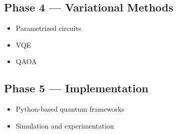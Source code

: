 \subsection*{Phase 4 --- Variational Methods}
\begin{itemize}
\item Parametrized circuits
\item VQE
\item QAOA
\end{itemize}

\subsection*{Phase 5 --- Implementation}
\begin{itemize}
\item Python-based quantum frameworks
\item Simulation and experimentation
\end{itemize}